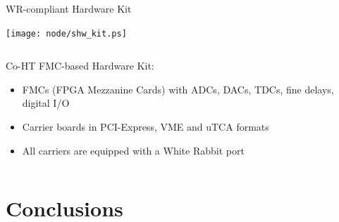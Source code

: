 \documentclass[compress,red]{beamer}
\begin{document}
\begin{frame}{WR-compliant Hardware Kit}

    \begin{center}
    \texttt{[image: node/shw\_kit.ps]}
    \end{center}

  \begin{columns}[c]

	\begin{block}{Co-HT FMC-based Hardware Kit:}
	  \begin{itemize}
	  \item FMCs (FPGA Mezzanine Cards) with ADCs, DACs, TDCs, fine delays, digital I/O
	  \item Carrier boards in PCI-Express, VME and uTCA formats
	  \item All carriers are equipped with a White Rabbit port
	  \end{itemize}
	\end{block}

  \end{columns}


\end{frame}
\section{Conclusions}
\end{document}
